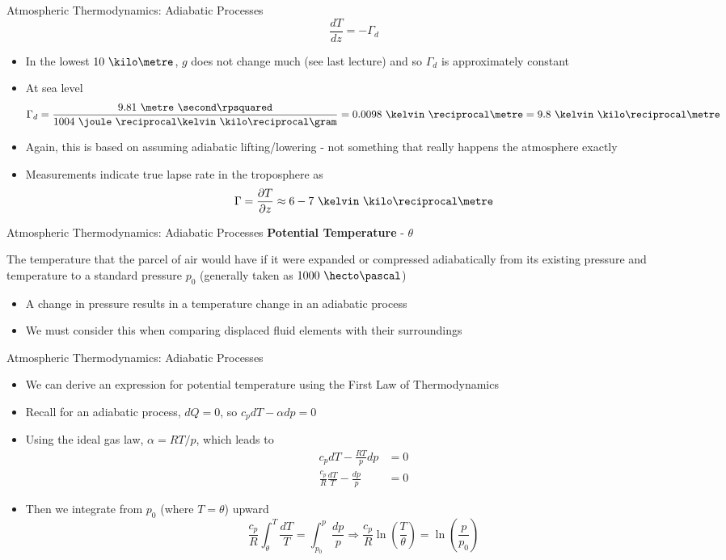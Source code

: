 \begin{frame}{Atmospheric Thermodynamics: Adiabatic Processes}
$$ \frac{dT}{dz} = -\Gamma_d$$
\begin{itemize}
	\item In the lowest $10\ \kilo\metre$, $g$ does not change much (see last lecture) and so $\Gamma_d$ is approximately constant 
	\item At sea level
	$$\Gamma_d = \frac{9.81\ \metre\ \second\rpsquared}{1004\ \joule\ \reciprocal\kelvin\ \kilo\reciprocal\gram} = 0.0098\ \kelvin\ \reciprocal\metre = 9.8\ \kelvin\ \kilo\reciprocal\metre$$
	\item Again, this is based on assuming adiabatic lifting/lowering - not something that really happens the atmosphere exactly
	\item Measurements indicate true lapse rate in the troposphere as
	$$\Gamma = \frac{\partial T}{\partial z} \approx 6-7\ \kelvin\ \kilo\reciprocal\metre$$
\end{itemize}
\end{frame}
\begin{frame}{Atmospheric Thermodynamics: Adiabatic Processes}
\textbf{Potential Temperature} - $\theta$
\begin{fancydefs}
	The temperature that the parcel of air would have if it were expanded or compressed adiabatically from its existing pressure and temperature to a standard pressure $p_0$ (generally taken as $1000\ \hecto\pascal$)
\end{fancydefs}
\begin{itemize}
	\item A change in pressure results in a temperature change in an adiabatic process
	\item We must consider this when comparing displaced fluid elements with their surroundings
\end{itemize}
\end{frame}

\begin{frame}{Atmospheric Thermodynamics: Adiabatic Processes}
\begin{itemize}
	\item We can derive an expression for potential temperature using the First Law of Thermodynamics
	\item Recall for an adiabatic process, $dQ=0$, so $c_p dT - \alpha dp=0$
	\item Using the ideal gas law, $\alpha = RT/p$, which leads to
	\begin{align*}
	c_pdT - \frac{RT}{p}dp &= 0\\
	\frac{c_p}{R}\frac{dT}{T} - \frac{dp}{p} &= 0
	\end{align*}
	\item Then we integrate from $p_0$ (where $T=\theta$) upward
	$$\frac{c_p}{R} \int^T_\theta \frac{dT}{T} = \int^p_{p_0} \frac{dp}{p} \Rightarrow \frac{c_p}{R}\ln{\left(\frac{T}{\theta}\right)} = \ln{\left(\frac{p}{p_0}\right)}$$
\end{itemize}
\end{frame}

